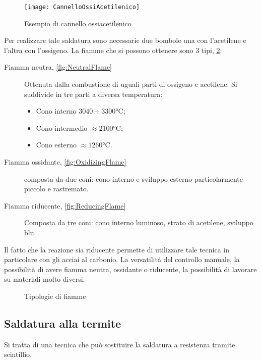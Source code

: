 \begin{figure}
\centering
\texttt{[image: CannelloOssiAcetilenico]}
\caption{Esempio di cannello ossiacetilenico}
\label{fig:CannelloOssiAcetilenico}
\end{figure}

Per realizzare tale saldatura sono necessarie due bombole una con l'acetilene e l'altra con l'ossigeno.
La fiamme che si possono ottenere sono 3 tipi, \ref{fig:Flames}:
\begin{description}
\item[Fiamma neutra, \ref{fig:NeutralFlame}] Ottenuta dalla combustione di uguali parti di ossigeno e acetilene. Si suddivide in tre parti a diversa temperatura:
	\begin{itemize}
	\item Cono interno $3040 \div 3300\unit{\celsius}$;
	\item Cono intermedio $\approx 2100\unit{\celsius}$;
	\item Cono esterno $\approx 1260\unit{\celsius}$.
	\end{itemize}
\item[Fiamma ossidante, \ref{fig:OxidizingFlame}] composta da due coni: cono interno e sviluppo esterno particolarmente piccolo e rastremato.
\item[Fiamma riducente, \ref{fig:ReducingFlame}] Composta da tre coni: cono interno luminoso, strato di acetilene, sviluppo blu.
\end{description}

Il fatto che la reazione sia riducente permette di utilizzare tale tecnica in particolare con gli acciai al carbonio.
La versatilità del controllo manuale, la possibilità di avere fiamma neutra, ossidante o riducente, la possibilità di lavorare su materiali molto diversi.

\begin{figure}
\centering
{}\quad
{}\quad
{}
\caption{Tipologie di fiamme}
\label{fig:Flames}
\end{figure}

\subsection{Saldatura alla termite}
Si tratta di una tecnica che può sostituire la saldatura a resistenza tramite scintillio.

